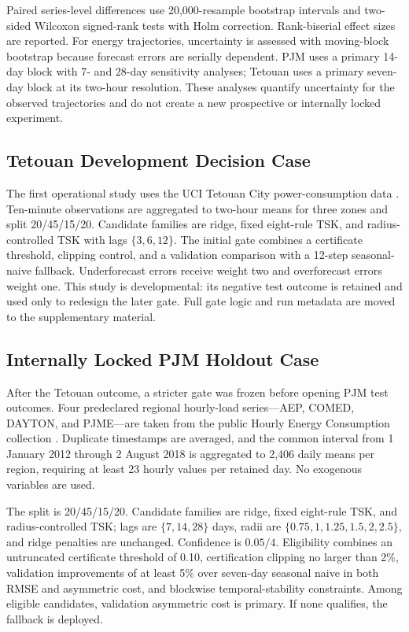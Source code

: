 Paired series-level differences use 20,000-resample bootstrap intervals and two-sided Wilcoxon signed-rank tests with Holm correction. Rank-biserial effect sizes are reported. For energy trajectories, uncertainty is assessed with moving-block bootstrap because forecast errors are serially dependent. PJM uses a primary 14-day block with 7- and 28-day sensitivity analyses; Tetouan uses a primary seven-day block at its two-hour resolution. These analyses quantify uncertainty for the observed trajectories and do not create a new prospective or internally locked experiment.

\subsection{Tetouan Development Decision Case}
The first operational study uses the UCI Tetouan City power-consumption data \cite{uci_tetouan_849}. Ten-minute observations are aggregated to two-hour means for three zones and split 20/45/15/20. Candidate families are ridge, fixed eight-rule TSK, and radius-controlled TSK with lags $\{3,6,12\}$. The initial gate combines a certificate threshold, clipping control, and a validation comparison with a 12-step seasonal-naive fallback. Underforecast errors receive weight two and overforecast errors weight one. This study is developmental: its negative test outcome is retained and used only to redesign the later gate. Full gate logic and run metadata are moved to the supplementary material.

\subsection{Internally Locked PJM Holdout Case}
After the Tetouan outcome, a stricter gate was frozen before opening PJM test outcomes. Four predeclared regional hourly-load series---AEP, COMED, DAYTON, and PJME---are taken from the public Hourly Energy Consumption collection \cite{mulla_hourly_energy}. Duplicate timestamps are averaged, and the common interval from 1 January 2012 through 2 August 2018 is aggregated to 2,406 daily means per region, requiring at least 23 hourly values per retained day. No exogenous variables are used.

The split is 20/45/15/20. Candidate families are ridge, fixed eight-rule TSK, and radius-controlled TSK; lags are $\{7,\allowbreak 14,\allowbreak 28\}$ days, radii are $\{0.75,\allowbreak 1,\allowbreak 1.25,\allowbreak 1.5,\allowbreak 2,\allowbreak 2.5\}$, and ridge penalties are unchanged. Confidence is $0.05/4$. Eligibility combines an untruncated certificate threshold of 0.10, certification clipping no larger than 2\%, validation improvements of at least 5\% over seven-day seasonal naive in both RMSE and asymmetric cost, and blockwise temporal-stability constraints. Among eligible candidates, validation asymmetric cost is primary. If none qualifies, the fallback is deployed.

